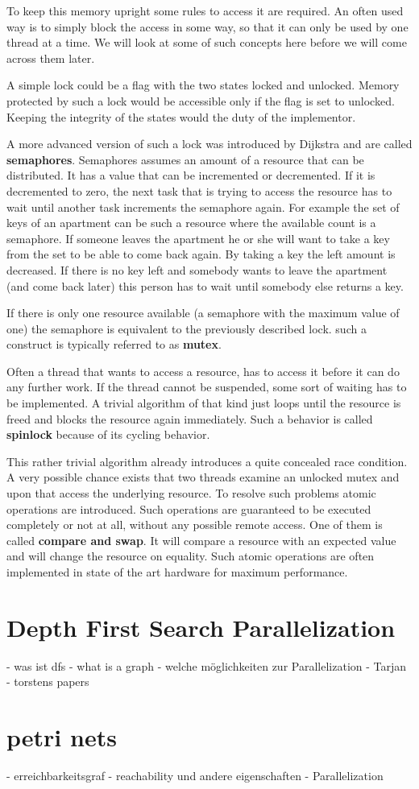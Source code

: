 To keep this memory upright some rules to access it are required. An often used way is to simply block the access in some way, so that it can only be used by one thread at a time. We will look at some of such concepts here before we will come across them later.
 
A simple lock could be a flag with the two states locked and unlocked. Memory protected by such a lock would be accessible only if the flag is set to unlocked. Keeping the integrity of the states would the duty of the implementor.

A more advanced version of such a lock was introduced by Dijkstra \cite{dijkstra1968cooperating} and are called \textbf{semaphores}. Semaphores assumes an amount of a resource that can be distributed. It has a value that can be incremented or decremented. If it is decremented to zero, the next task that is trying to access the resource has to wait until another task increments the semaphore again. For example the set of keys of an apartment can be such a resource where the available count is a semaphore. If someone leaves the apartment he or she will want to take a key from the set to be able to come back again. By taking a key the left amount is decreased. If there is no key left and somebody wants to leave the apartment (and come back later) this person has to wait until somebody else returns a key.

If there is only one resource available (a semaphore with the maximum value of one) the semaphore is equivalent to the previously described lock. such a construct is typically referred to as \textbf{mutex}.

Often a thread that wants to access a resource, has to access it before it can do any further work. If the thread cannot be suspended, some sort of waiting has to be implemented. A trivial algorithm of that kind just loops until the resource is freed and blocks the resource again immediately. Such a behavior is called \textbf{spinlock} because of its cycling behavior.

This rather trivial algorithm already introduces a quite concealed race condition. A very possible chance exists that two threads examine an unlocked mutex and upon that access the underlying resource. To resolve such problems atomic operations are introduced. Such operations are guaranteed to be executed completely or not at all, without any possible remote access. One of them is called \textbf{compare and swap}. It will compare a resource with an expected value and will change the resource on equality. Such atomic operations are often implemented in state of the art hardware for maximum performance.

\section{Depth First Search Parallelization}
- was ist dfs
- what is a graph
- welche möglichkeiten zur Parallelization
- Tarjan
- torstens papers

\section{petri nets}
- erreichbarkeitsgraf
- reachability und andere eigenschaften
- Parallelization

